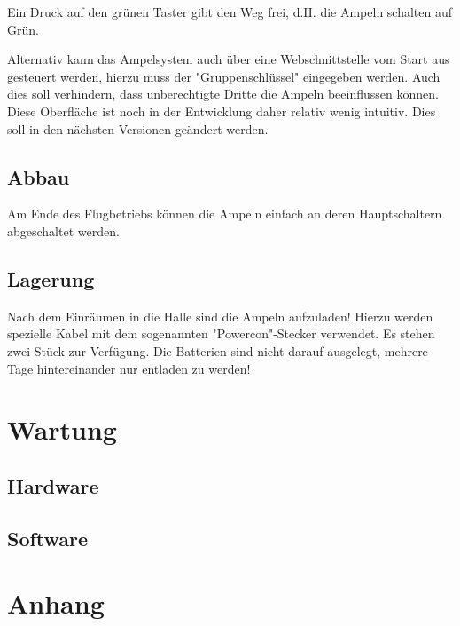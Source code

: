 \documentclass[a4paper, ngerman]{scrartcl}
\begin{document}
Ein Druck auf den grünen Taster gibt den Weg frei, d.H. die Ampeln schalten auf Grün.

Alternativ kann das Ampelsystem auch über eine Webschnittstelle vom Start aus gesteuert werden, hierzu muss der "Gruppenschlüssel" eingegeben werden. Auch dies soll verhindern, dass unberechtigte Dritte die Ampeln beeinflussen können. Diese Oberfläche ist noch in der Entwicklung daher relativ wenig intuitiv. Dies soll in den nächsten Versionen geändert werden.

\subsection{Abbau}
Am Ende des Flugbetriebs können die Ampeln einfach an deren Hauptschaltern abgeschaltet werden.

\subsection{Lagerung}
Nach dem Einräumen in die Halle sind die Ampeln aufzuladen! Hierzu werden spezielle Kabel mit dem sogenannten "Powercon"-Stecker verwendet. Es stehen zwei Stück zur Verfügung. Die Batterien sind nicht darauf ausgelegt, mehrere Tage hintereinander nur entladen zu werden!

\section{Wartung}
\subsection{Hardware}
\subsection{Software}

\section{Anhang}
\end{document}
